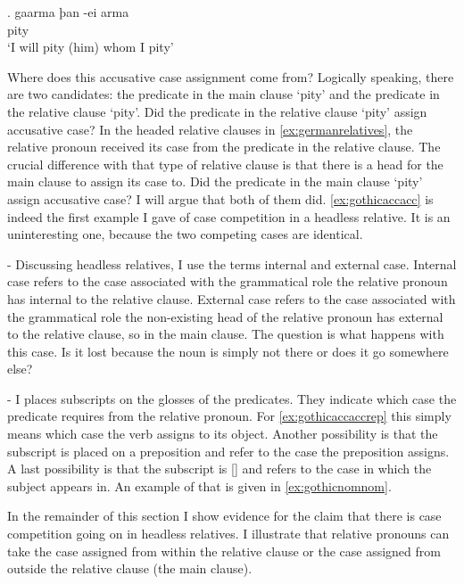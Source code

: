 \exg. gaarma þan -ei arma\\
 pity\scsub{[acc]}   \\
 `I will pity (him) whom I pity' \label{ex:gothicaccacc}



 Where does this accusative case assignment come from? Logically speaking, there are two candidates: the predicate in the main clause  `pity' and the predicate in the relative clause  `pity'. Did the predicate in the relative clause  `pity' assign accusative case? In the headed relative clauses in \ref{ex:germanrelatives}, the relative pronoun received its case from the predicate in the relative clause. The crucial difference with that type of relative clause is that there is a head for the main clause to assign its case to. Did the predicate in the main clause  `pity' assign accusative case? I will argue that both of them did. \ref{ex:gothicaccacc} is indeed the first example I gave of case competition in a headless relative. It is an uninteresting one, because the two competing cases are identical.

 - Discussing headless relatives, I use the terms internal and external case. Internal case refers to the case associated with the grammatical role the relative pronoun has internal to the relative clause. External case refers to the case associated with the grammatical role the non-existing head of the relative pronoun has external to the relative clause, so in the main clause. The question is what happens with this case. Is it lost because the noun is simply not there or does it go somewhere else?

 - I places subscripts on the glosses of the predicates. They indicate which case the predicate requires from the relative pronoun. For \ref{ex:gothicaccaccrep} this simply means which case the verb assigns to its object. Another possibility is that the subscript is placed on a preposition and refer to the case the preposition assigns. A last possibility is that the subscript is [] and refers to the case in which the subject appears in. An example of that is given in \ref{ex:gothicnomnom}.





In the remainder of this section I show evidence for the claim that there is case competition going on in headless relatives. I illustrate that relative pronouns can take the case assigned from within the relative clause or the case assigned from outside the relative clause (the main clause).

